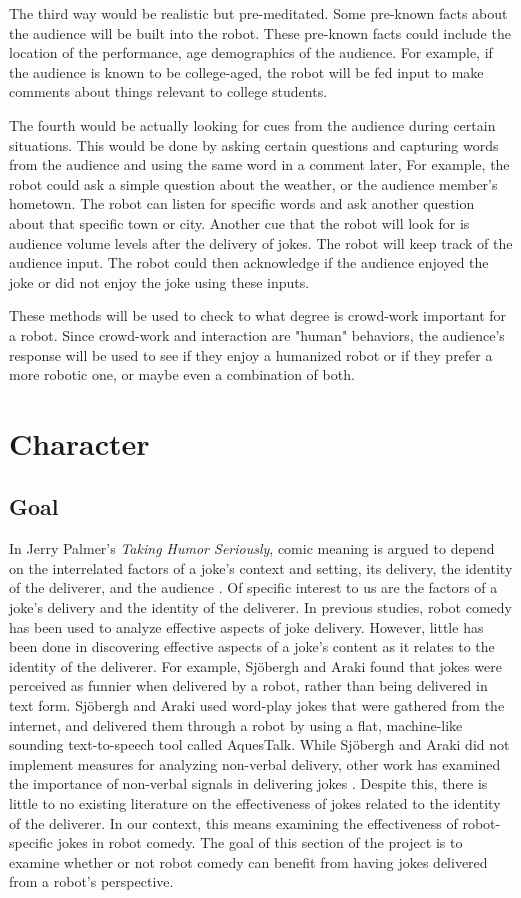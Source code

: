 \documentclass[onecolumn, draftclsnofoot,10pt, compsoc]{IEEEtran}
\begin{document}
The third way would be realistic but pre-meditated. Some pre-known facts about the audience will be built into the robot. These pre-known facts could include the location of the performance, age demographics of the audience. For example, if the audience is known to be college-aged, the robot will be fed input to make comments about things relevant to college students.

The fourth would be actually looking for cues from the audience during certain situations. This would be done by asking certain questions and capturing words from the audience and using the same word in a comment later,  For example, the robot could ask a simple question about the weather, or the audience member's hometown. The robot can listen for specific words and ask another question about that specific town or city. Another cue that the robot will look for is audience volume levels after the delivery of jokes. The robot will keep track of the audience input. The robot could then acknowledge if the audience enjoyed the joke or did not enjoy the joke using these inputs.

These methods will be used to check to what degree is crowd-work important for a robot. Since crowd-work and interaction are "human" behaviors, the audience's response will be used to see if they enjoy a humanized robot or if they prefer a more robotic one, or maybe even a combination of both.


\section{Character}
\subsection{Goal}
In Jerry Palmer's \textit{Taking Humor Seriously}, comic meaning is argued to depend on the interrelated factors of a joke's context and setting, its delivery, the identity of the deliverer, and the audience \cite{Palmer:1993}.
Of specific interest to us are the factors of a joke's delivery and the identity of the deliverer.
In previous studies, robot comedy has been used to analyze effective aspects of joke delivery.
However, little has been done in discovering effective aspects of a joke's content as it relates to the identity of the deliverer.
For example, Sj\"{o}bergh and Araki \cite{RobotsMakeThings:2008} found that jokes were perceived as funnier when delivered by a robot, rather than being delivered in text form.
Sj\"{o}bergh and Araki used word-play jokes that were gathered from the internet, and delivered them through a robot by using a flat, machine-like sounding text-to-speech tool called AquesTalk.
While Sj\"{o}bergh and Araki did not implement measures for analyzing non-verbal delivery, other work has examined the importance of non-verbal signals in delivering jokes \cite{KatevasRobot:2014} \cite{KnightEightLessons:2011}.
Despite this, there is little to no existing literature on the effectiveness of jokes related to the identity of the deliverer.
In our context, this means examining the effectiveness of robot-specific jokes in robot comedy.
The goal of this section of the project is to examine whether or not robot comedy can benefit from having jokes delivered from a robot's perspective.
\end{document}
